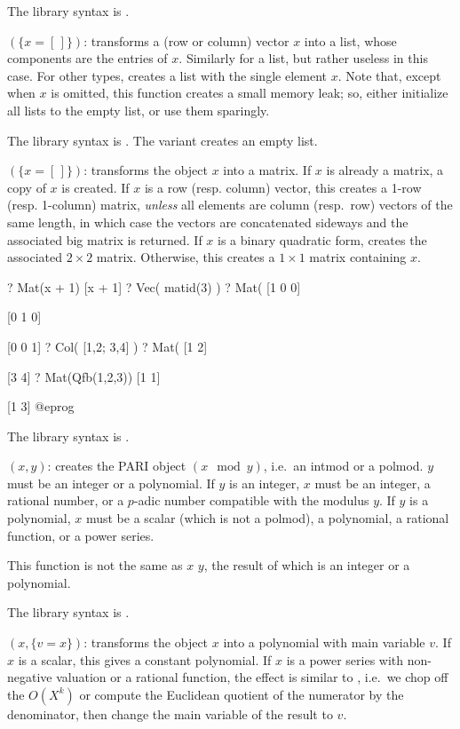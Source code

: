 The library syntax is .

$(\{x=[\,]\})$: \label{se:List}
transforms a (row or column) vector $x$ into a list, whose components are
the entries of $x$. Similarly for a list, but rather useless in this case.
For other types, creates a list with the single element $x$. Note that,
except when $x$ is omitted, this function creates a small memory leak; so,
either initialize all lists to the empty list, or use them sparingly.

The library syntax is .
The variant  creates an empty list.

$(\{x=[\,]\})$: \label{se:Mat}
transforms the object $x$ into a matrix.
If $x$ is already a matrix, a copy of $x$ is created.
If $x$ is a row (resp. column) vector, this creates a 1-row (resp.
1-column) matrix, \emph{unless} all elements are column (resp.~row) vectors
of the same length, in which case the vectors are concatenated sideways
and the associated big matrix is returned.
If $x$ is a binary quadratic form, creates the associated $2\times 2$
matrix. Otherwise, this creates a $1\times 1$ matrix containing $x$.

\bprog
? Mat(x + 1)
[x + 1]
? Vec( matid(3) )
? Mat(%
[1 0 0]

[0 1 0]

[0 0 1]
? Col( [1,2; 3,4] )
? Mat(%
[1 2]

[3 4]
? Mat(Qfb(1,2,3))
[1 1]

[1 3]
@eprog

The library syntax is .

$(x,y)$: \label{se:Mod}
creates the PARI object
$(x \mod y)$, i.e.~an intmod or a polmod. $y$ must be an integer or a
polynomial. If $y$ is an integer, $x$ must be an integer, a rational
number, or a $p$-adic number compatible with the modulus $y$. If $y$ is a
polynomial, $x$ must be a scalar (which is not a polmod), a polynomial, a
rational function, or a power series.

This function is not the same as $x$ \kbd{\%} $y$, the result of which is an
integer or a polynomial.

The library syntax is .

$(x,\{v=x\})$: \label{se:Pol}
transforms the object $x$ into a polynomial with main variable $v$. If $x$
is a scalar, this gives a constant polynomial. If $x$ is a power series with
non-negative valuation or a rational function, the effect is similar to
, i.e.~we chop off the $O(X^k)$ or compute the Euclidean
quotient of the numerator by the denominator, then change the main variable
of the result to $v$.

